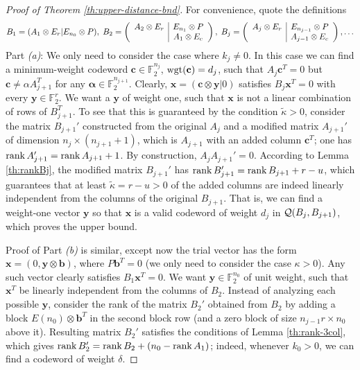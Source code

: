 \documentclass[aps,prb,12pt,tightenlines,%
notitlepage,longbibliography]{revtex4-1}
\begin{document}
\begin{proof}[Proof of Theorem \ref{th:upper-distance-bnd}]
  For convenience, quote the definitions
$$
    B_1=(A_1\otimes E_{r}|E_{n_0}\otimes P),\;
    B_2=\left(
      \begin{array}[c]{c|c}
        A_2\otimes E_r&E_{n_1}\otimes P\\
        & A_1\otimes E_c
      \end{array}\right),\; 
    B_j=\left(
      \begin{array}[c]{c|c}
        A_j\otimes E_r&E_{n_{j-1}}\otimes P\\
        & A_{j-1}\otimes E_c
      \end{array}\right),\ldots 
$$
Part \emph{(a)}: We only need to consider the case where $k_j\neq0$.
In this case we can find a minimum-weight codeword
$\mathbf{c}\in\mathbb{F}_2^{n_j}$, $\mathop{\rm wgt}(\mathbf{c})=d_j$, such that
$A_j\mathbf{c}^T=0$ but $\mathbf{c}\neq \alpha A_{j+1}^T$ for any
$\mathbf{\alpha}\in\mathbb{F}_2^{n_{j+1}}$.  Clearly,
$\mathbf{x}=(\mathbf{c}\otimes \mathbf{y}|0)$ satisfies
$B_j \mathbf{x}^T=0$ with every $\mathbf{y}\in \mathbb{F}_2^{r}$.  We
want a $\mathbf{y}$ of weight one, such that $\mathbf{x}$ is not a
linear combination of rows of $B_{j+1}^T$.  To see that this is
guaranteed by the condition $\tilde{\kappa}>0$, consider the matrix
$B_{j+1}'$ constructed from the original $A_j$ and a modified matrix
$A_{j+1}'$ of dimension $n_j\times (n_{j+1}+1)$, which is $A_{j+1}$
with an added column $\mathbf{c}^T$; one has
$\mathop{\rm rank} A_{j+1}'=\mathop{\rm rank} A_{j+1}+1$.  By construction, $A_jA_{j+1}'=0$.
According to Lemma \ref{th:rankBj}, the modified matrix $B_{j+1}'$ has
$\mathop{\rm rank} B_{j+1}'=\mathop{\rm rank} B_{j+1}+r-u$, which guarantees that at least
$\tilde{\kappa}=r-u>0$ of the added columns are indeed linearly
independent from the columns of the original $B_{j+1}$.  That is, we
can find a weight-one vector $\mathbf{y}$ so that $\mathbf{x}$ is a
valid codeword of weight $d_j$ in ${\cal Q}(B_j,B_{j+1})$, which
proves the upper bound.

Proof of Part \emph{(b)} is similar, except now the trial vector has
the form $\mathbf{x}=(0,\mathbf{y}\otimes \mathbf{b})$, where
$P\mathbf{b}^T=0$ (we only need to consider the case $\kappa>0$).  Any
such vector clearly satisfies $B_1\mathbf{x}^T=0$.  We want
$\mathbf{y}\in\mathbb{F}_2^{n_0}$ of unit weight, such that
$\mathbf{x}^T$ be linearly independent from the columns of $B_2$.
Instead of analyzing each possible $\mathbf{y}$, consider the rank of
the matrix $B_2'$ obtained from $B_2$ by adding a block
$E(n_0)\otimes \mathbf{b}^T$ in the second block row (and a zero block
of size $n_{j-1}r\times n_0$ above it).  Resulting matrix $B_2'$
satisfies the conditions of Lemma \ref{th:rank-3col}, which gives
$\mathop{\rm rank} B_2'=\mathop{\rm rank} B_2+(n_0-\mathop{\rm rank} A_1)$; indeed, whenever $k_0>0$, we
can find a codeword of weight $\delta$.


\end{proof}
\end{document}
